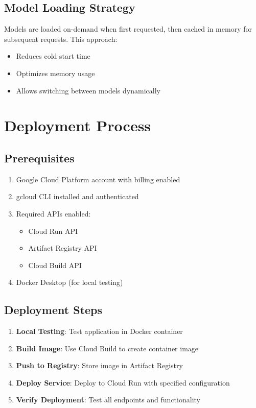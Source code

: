 \documentclass[12pt,a4paper]{article}
\begin{document}
\subsection{Model Loading Strategy}
Models are loaded on-demand when first requested, then cached in memory for subsequent requests. This approach:
\begin{itemize}
    \item Reduces cold start time
    \item Optimizes memory usage
    \item Allows switching between models dynamically
\end{itemize}

\section{Deployment Process}

\subsection{Prerequisites}
\begin{enumerate}
    \item Google Cloud Platform account with billing enabled
    \item gcloud CLI installed and authenticated
    \item Required APIs enabled:
    \begin{itemize}
        \item Cloud Run API
        \item Artifact Registry API
        \item Cloud Build API
    \end{itemize}
    \item Docker Desktop (for local testing)
\end{enumerate}

\subsection{Deployment Steps}
\begin{enumerate}
    \item \textbf{Local Testing}: Test application in Docker container
    \item \textbf{Build Image}: Use Cloud Build to create container image
    \item \textbf{Push to Registry}: Store image in Artifact Registry
    \item \textbf{Deploy Service}: Deploy to Cloud Run with specified configuration
    \item \textbf{Verify Deployment}: Test all endpoints and functionality
\end{enumerate}
\end{document}
